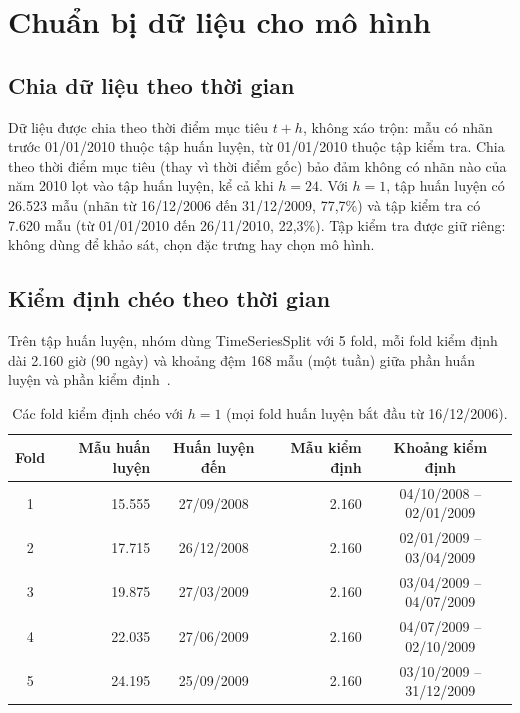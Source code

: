 \section{Chuẩn bị dữ liệu cho mô hình}
\label{sec:preparation}

\subsection{Chia dữ liệu theo thời gian}
Dữ liệu được chia theo thời điểm mục tiêu $t+h$, không xáo trộn: mẫu có nhãn trước 01/01/2010 thuộc tập huấn luyện, từ 01/01/2010 thuộc tập kiểm tra. Chia theo thời điểm mục tiêu (thay vì thời điểm gốc) bảo đảm không có nhãn nào của năm 2010 lọt vào tập huấn luyện, kể cả khi $h = 24$. Với $h = 1$, tập huấn luyện có 26.523 mẫu (nhãn từ 16/12/2006 đến 31/12/2009, 77,7\%) và tập kiểm tra có 7.620 mẫu (từ 01/01/2010 đến 26/11/2010, 22,3\%). Tập kiểm tra được giữ riêng: không dùng để khảo sát, chọn đặc trưng hay chọn mô hình.

\subsection{Kiểm định chéo theo thời gian}
Trên tập huấn luyện, nhóm dùng TimeSeriesSplit với 5 fold, mỗi fold kiểm định dài 2.160 giờ (90 ngày) và khoảng đệm 168 mẫu (một tuần) giữa phần huấn luyện và phần kiểm định~\cite{sklearn2026tss}.

\begin{table}[htbp]
    \centering
    \caption{Các fold kiểm định chéo với $h = 1$ (mọi fold huấn luyện bắt đầu từ 16/12/2006).}
    \label{tab:folds}
    \small
    \begin{tabular}{|c|r|c|r|c|}
        \hline
        \textbf{Fold} & \textbf{Mẫu huấn luyện} & \textbf{Huấn luyện đến} & \textbf{Mẫu kiểm định} & \textbf{Khoảng kiểm định} \\ \hline
        1 & 15.555 & 27/09/2008 & 2.160 & 04/10/2008 -- 02/01/2009 \\ \hline
        2 & 17.715 & 26/12/2008 & 2.160 & 02/01/2009 -- 03/04/2009 \\ \hline
        3 & 19.875 & 27/03/2009 & 2.160 & 03/04/2009 -- 04/07/2009 \\ \hline
        4 & 22.035 & 27/06/2009 & 2.160 & 04/07/2009 -- 02/10/2009 \\ \hline
        5 & 24.195 & 25/09/2009 & 2.160 & 03/10/2009 -- 31/12/2009 \\ \hline
    \end{tabular}
\end{table}

